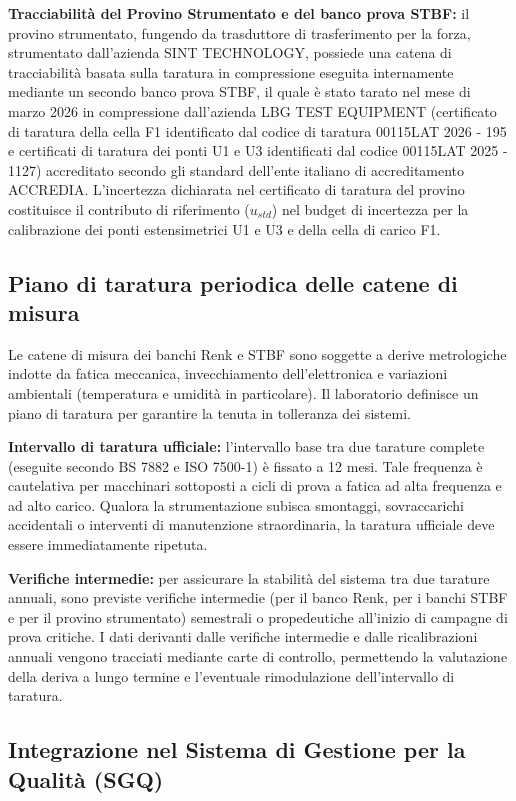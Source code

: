 \documentclass[a4paper, twoside]{article}
\begin{document}
\textbf{Tracciabilità del Provino Strumentato e del banco prova STBF:} il provino strumentato, fungendo da trasduttore di trasferimento per la forza, strumentato dall'azienda SINT TECHNOLOGY, possiede una catena di tracciabilità basata sulla taratura in compressione eseguita internamente mediante un secondo banco prova STBF, il quale è stato tarato nel mese di marzo 2026 in compressione dall'azienda LBG TEST EQUIPMENT (certificato di taratura della cella F1 identificato dal codice di taratura  00115LAT 2026 - 195 e certificati di taratura dei ponti U1 e U3 identificati dal codice 00115LAT 2025 - 1127) accreditato secondo gli standard dell'ente italiano di accreditamento ACCREDIA. L'incertezza dichiarata nel certificato di taratura del provino costituisce il contributo di riferimento ($u_{std}$) nel budget di incertezza per la calibrazione dei ponti estensimetrici U1 e U3 e della cella di carico F1.


\subsection{Piano di taratura periodica delle catene di misura}

Le catene di misura dei banchi Renk e STBF sono soggette a derive metrologiche indotte da fatica meccanica, invecchiamento dell'elettronica e variazioni ambientali (temperatura e umidità in particolare). Il laboratorio definisce un piano di taratura per garantire la tenuta in tolleranza dei sistemi.

\textbf{Intervallo di taratura ufficiale:} l'intervallo base tra due tarature complete (eseguite secondo BS 7882 e ISO 7500-1) è fissato a 12 mesi. Tale frequenza è cautelativa per macchinari sottoposti a cicli di prova a fatica ad alta frequenza e ad alto carico. Qualora la strumentazione subisca smontaggi, sovraccarichi accidentali o interventi di manutenzione straordinaria, la taratura ufficiale deve essere immediatamente ripetuta.

\textbf{Verifiche intermedie:} per assicurare la stabilità del sistema tra due tarature annuali, sono previste verifiche intermedie (per il banco Renk, per i banchi STBF e per il provino strumentato) semestrali o propedeutiche all'inizio di campagne di prova critiche. I dati derivanti dalle verifiche intermedie e dalle ricalibrazioni annuali vengono tracciati mediante carte di controllo, permettendo la valutazione della deriva a lungo termine e l'eventuale rimodulazione dell'intervallo di taratura.

\subsection{Integrazione nel Sistema di Gestione per la Qualità (SGQ)}
\end{document}
